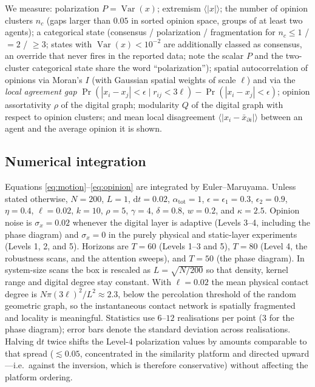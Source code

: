 \documentclass[5p,times,twocolumn]{elsarticle}
\newcommand{\dd}{\mathrm{d}}
\begin{document}
We measure: polarization $P = \operatorname{Var}(x)$; extremism
$\langle |x| \rangle$; the number of opinion clusters $n_c$ (gaps larger
than $0.05$ in sorted opinion space, groups of at least two agents); a
categorical state (consensus / polarization / fragmentation for
$n_c \le 1$ / $= 2$ / $\ge 3$; states with
$\operatorname{Var}(x) < 10^{-2}$ are additionally classed as consensus,
an override that never fires in the reported data; note the scalar $P$
and the two-cluster categorical state share the word ``polarization'');
spatial autocorrelation of opinions via
Moran's $I$ (with Gaussian spatial weights of scale $\ell$) and via the
\emph{local agreement gap}
$\Pr(|x_i - x_j| < \epsilon \mid r_{ij} < 3\ell) - \Pr(|x_i - x_j| <
\epsilon)$; opinion assortativity $\rho$ of the digital graph; modularity
$Q$ of the digital graph with respect to opinion clusters; and mean local
disagreement $\langle |x_i - \bar{x}_{\partial i}| \rangle$ between an
agent and the average opinion it is shown.

\subsection{Numerical integration}

Equations \eqref{eq:motion}--\eqref{eq:opinion} are integrated by
Euler--Maruyama. Unless stated otherwise, $N = 200$, $L = 1$,
$\dd t = 0.02$, $\alpha_{\mathrm{tot}} = 1$, $\epsilon = \epsilon_1 = 0.3$,
$\epsilon_2 = 0.9$, $\eta = 0.4$, $\ell = 0.02$, $k = 10$, $\rho = 5$,
$\gamma = 4$, $\delta = 0.8$, $w = 0.2$, and $\kappa = 2.5$. Opinion noise
is $\sigma_x = 0.02$ whenever the digital layer is adaptive (Levels 3--4,
including the phase diagram) and $\sigma_x = 0$ in the purely physical and
static-layer experiments (Levels 1, 2, and 5). Horizons are $T = 60$
(Levels 1--3 and 5), $T = 80$ (Level 4, the robustness scans, and the
attention sweeps), and $T = 50$ (the phase diagram). In system-size
scans the box is rescaled as $L = \sqrt{N/200}$ so that density, kernel
range and digital degree stay constant. With $\ell = 0.02$ the mean
physical contact degree is $N\pi(3\ell)^2/L^2 \approx 2.3$, below the
percolation threshold of the random geometric graph, so the instantaneous
contact network is spatially fragmented and locality is meaningful.
Statistics use $6$--$12$ realisations per point ($3$ for the phase
diagram); error bars denote the standard deviation across realisations.
Halving $\dd t$ twice shifts the Level-4 polarization values by amounts
comparable to that spread ($\lesssim 0.05$, concentrated in the
similarity platform and directed upward---i.e.\ against the inversion,
which is therefore conservative) without affecting the platform
ordering.
\end{document}
